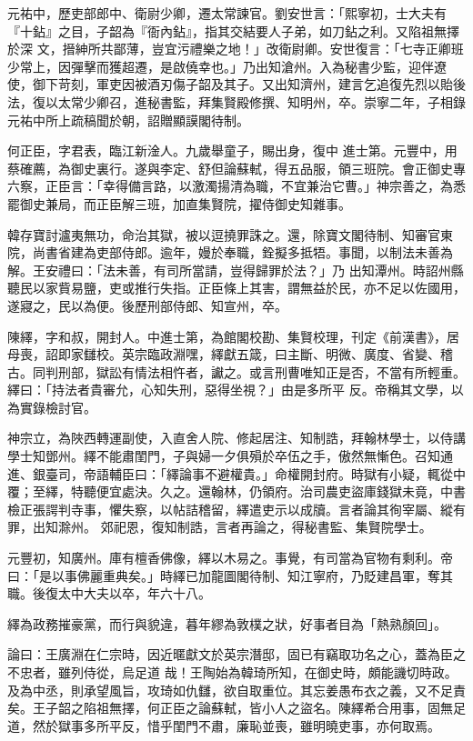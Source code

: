 \begin{pinyinscope}
 元祐中，歷吏部郎中、衛尉少卿，遷太常諫官。劉安世言：「熙寧初，士大夫有『十鉆』之目，子韶為『衙內鉆』，指其交結要人子弟，如刀鉆之利。又陷祖無擇於深
 文，搢紳所共鄙薄，豈宜污禮樂之地！」改衛尉卿。安世復言：「七寺正卿班少常上，因彈擊而獲超遷，是啟僥幸也。」乃出知滄州。入為秘書少監，迎伴遼使，御下苛刻，軍吏因被酒刃傷子韶及其子。又出知濟州，建言乞追復先烈以貽後法，復以太常少卿召，進秘書監，拜集賢殿修撰、知明州，卒。崇寧二年，子相錄元祐中所上疏稿聞於朝，詔贈顯謨閣待制。



 何正臣，字君表，臨江新淦人。九歲舉童子，賜出身，復中
 進士第。元豐中，用蔡確薦，為御史裏行。遂與李定、舒但論蘇軾，得五品服，領三班院。會正御史專六察，正臣言：「幸得備言路，以激濁揚清為職，不宜兼治它曹。」神宗善之，為悉罷御史兼局，而正臣解三班，加直集賢院，擢侍御史知雜事。



 韓存寶討瀘夷無功，命治其獄，被以逗撓罪誅之。還，除寶文閣待制、知審官東院，尚書省建為吏部侍郎。逾年，嫚於奉職，銓擬多抵牾。事聞，以制法未善為解。王安禮曰：「法未善，有司所當請，豈得歸罪於法？」乃
 出知潭州。時詔州縣聽民以家貲易鹽，吏或推行失指。正臣條上其害，謂無益於民，亦不足以佐國用，遂寢之，民以為便。後歷刑部侍郎、知宣州，卒。



 陳繹，字和叔，開封人。中進士第，為館閣校勘、集賢校理，刊定《前漢書》，居母喪，詔即家讎校。英宗臨政淵嘿，繹獻五箴，曰主斷、明微、廣度、省變、稽古。同判刑部，獄訟有情法相忤者，讞之。或言刑曹唯知正是否，不當有所輕重。繹曰：「持法者貴審允，心知失刑，惡得坐視？」由是多所平
 反。帝稱其文學，以為實錄檢討官。



 神宗立，為陜西轉運副使，入直舍人院、修起居注、知制誥，拜翰林學士，以侍講學士知鄧州。繹不能肅閨門，子與婦一夕俱殞於卒伍之手，傲然無慚色。召知通進、銀臺司，帝語輔臣曰：「繹論事不避權貴。」命權開封府。時獄有小疑，輒從中覆；至繹，特聽便宜處決。久之。還翰林，仍領府。治司農吏盜庫錢獄未竟，中書檢正張諤判寺事，懼失察，以帖詰稽留，繹遣吏示以成牘。言者論其徇宰屬、縱有罪，出知滁州。
 郊祀恩，復知制誥，言者再論之，得秘書監、集賢院學士。



 元豐初，知廣州。庫有檀香佛像，繹以木易之。事覺，有司當為官物有剩利。帝曰：「是以事佛麗重典矣。」時繹已加龍圖閣待制、知江寧府，乃貶建昌軍，奪其職。後復太中大夫以卒，年六十八。



 繹為政務摧豪黨，而行與貌違，暮年繆為敦樸之狀，好事者目為「熱熟顏回」。



 論曰：王廣淵在仁宗時，因近暱獻文於英宗潛邸，固已有竊取功名之心，蓋為臣之不忠者，雖列侍從，烏足道
 哉！王陶始為韓琦所知，在御史時，頗能譏切時政。及為中丞，則承望風旨，攻琦如仇讎，欲自取重位。其忘姜愚布衣之義，又不足責矣。王子韶之陷祖無擇，何正臣之論蘇軾，皆小人之盜名。陳繹希合用事，固無足道，然於獄事多所平反，惜乎閨門不肅，廉恥並喪，雖明曉吏事，亦何取焉。



\end{pinyinscope}
